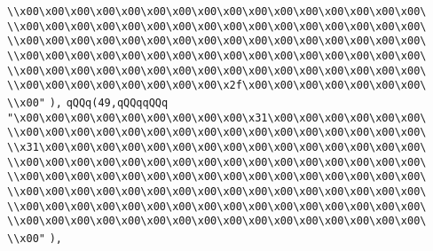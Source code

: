 \verb|\\x00\x00\x00\x00\x00\x00\x00\x00\x00\x00\x00\x00\x00\x00\x00\x00\|\newline
\verb|\\x00\x00\x00\x00\x00\x00\x00\x00\x00\x00\x00\x00\x00\x00\x00\x00\|\newline
\verb|\\x00\x00\x00\x00\x00\x00\x00\x00\x00\x00\x00\x00\x00\x00\x00\x00\|\newline
\verb|\\x00\x00\x00\x00\x00\x00\x00\x00\x00\x00\x00\x00\x00\x00\x00\x00\|\newline
\verb|\\x00\x00\x00\x00\x00\x00\x00\x00\x00\x00\x00\x00\x00\x00\x00\x00\|\newline
\verb|\\x00\x00\x00\x00\x00\x00\x00\x00\x2f\x00\x00\x00\x00\x00\x00\x00\|\newline
\verb|\\x00"|\newline
\verb|),|\newline
\verb|qQQq(49,qQQqqQQq|\newline
\verb|"\x00\x00\x00\x00\x00\x00\x00\x00\x00\x31\x00\x00\x00\x00\x00\x00\|\newline
\verb|\\x00\x00\x00\x00\x00\x00\x00\x00\x00\x00\x00\x00\x00\x00\x00\x00\|\newline
\verb|\\x31\x00\x00\x00\x00\x00\x00\x00\x00\x00\x00\x00\x00\x00\x00\x00\|\newline
\verb|\\x00\x00\x00\x00\x00\x00\x00\x00\x00\x00\x00\x00\x00\x00\x00\x00\|\newline
\verb|\\x00\x00\x00\x00\x00\x00\x00\x00\x00\x00\x00\x00\x00\x00\x00\x00\|\newline
\verb|\\x00\x00\x00\x00\x00\x00\x00\x00\x00\x00\x00\x00\x00\x00\x00\x00\|\newline
\verb|\\x00\x00\x00\x00\x00\x00\x00\x00\x00\x00\x00\x00\x00\x00\x00\x00\|\newline
\verb|\\x00\x00\x00\x00\x00\x00\x00\x00\x00\x00\x00\x00\x00\x00\x00\x00\|\newline
\verb|\\x00"|\newline
\verb|),|\newline
